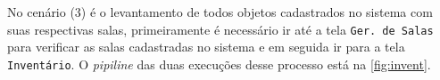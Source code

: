 \begin{figure}[ht]
             \hspace{0.5cm}
              \hspace{0.5cm}
              \hspace{0.5cm}      
              \hspace{0.5cm}
\end{figure}
No cenário (3) é o levantamento de todos objetos cadastrados no sistema com suas respectivas salas, primeiramente é necessário ir até a tela \texttt{Ger. de Salas} para verificar as salas cadastradas no sistema e em seguida ir para a tela \texttt{Inventário}. O \textit{pipiline} das duas execuções desse processo está na \autoref{fig:invent}.

